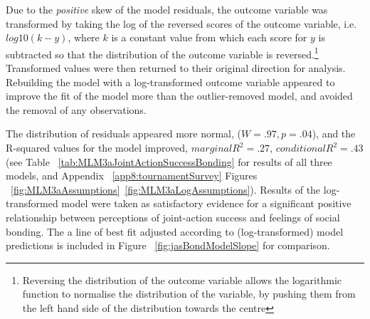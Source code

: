 \begin{CJK}{UTF8}{gbsn}
Due to the \textit{positive} skew of the model residuals, the outcome variable was transformed by taking the log of the reversed scores of the outcome variable, i.e. $log10(k - y)$, where $k$ is a constant value from which each score for $y$ is subtracted so that the distribution of the outcome variable is reversed\citep{Howell2012}.\footnote{Reversing the distribution of the outcome variable allows the logarithmic function to normalise the distribution of the variable, by pushing them from the left hand side of the distribution towards the centre}  Transformed values were then returned to their original direction for analysis\citep{Field2012}.  Rebuilding the model with a log-transformed outcome variable appeared to improve the fit of the model more than the outlier-removed model, and avoided the removal of any observations.

The distribution of residuals appeared more normal, ($W = .97, p = .04$), and the R-squared values for the model improved, $marginal R^2 = .27$, $conditional R^2 = .43$ (see Table ~\ref{tab:MLM3aJointActionSuccessBonding} for results of all three models, and Appendix ~\ref{app8:tournamentSurvey} Figures ~\ref{fig:MLM3aAssumptions}\nobreakdash~\ref{fig:MLM3aLogAssumptions}). Results of the log-transformed model were taken as satisfactory evidence for a significant positive relationship between perceptions of joint-action success and feelings of social bonding.  The a line of best fit adjusted according to (log-transformed) model predictions is included in Figure ~\ref{fig:jasBondModelSlope} for comparison.
  



\end{CJK}
